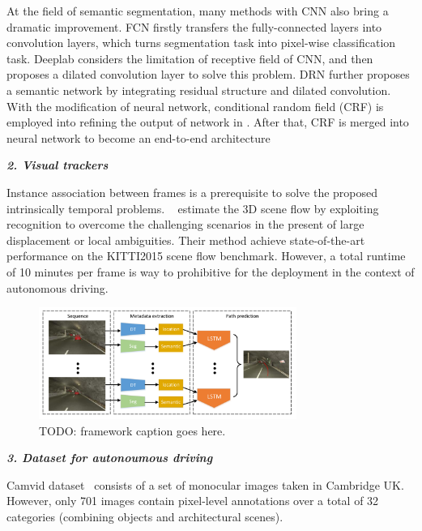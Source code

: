 \documentclass[10pt,twocolumn,letterpaper]{article}
\begin{document}
At the field of semantic segmentation, many methods with CNN also bring a dramatic improvement. FCN \cite{long2015fully} firstly transfers the fully-connected layers into convolution layers, which turns segmentation task into pixel-wise classification task. Deeplab \cite{chen2016deeplab} considers the limitation of receptive field of CNN, and then proposes a dilated convolution layer to solve this problem. DRN \cite{yu2017dilated} further proposes a semantic network by integrating residual structure and dilated convolution. With the modification of neural network, conditional random field (CRF) is employed into refining the output of network in \cite{chen2016deeplab}. After that, CRF is merged into neural network to become an end-to-end architecture \cite{liu2015semantic,zheng2015conditional,arnab2016higher}

\textbf{\emph{2. Visual trackers}}

Instance association between frames is a prerequisite to solve the proposed intrinsically temporal problems. ~\cite{behl2017bounding} estimate the 3D scene flow by exploiting recognition to overcome the challenging scenarios in the present of large displacement or local ambiguities. Their method achieve state-of-the-art performance on the KITTI2015 scene flow benchmark. However, a total runtime of 10 minutes per frame is way to prohibitive for the deployment in the context of autonomous driving.


\begin{figure}[t]
        \centering
        \includegraphics[width=0.75\textwidth]{figures/framework.pdf}
        \caption{ {\small TODO: framework caption goes here.}}
        \label{fig:framework}
\end{figure}

\textbf{\emph{3. Dataset for autonoumous driving}}

Camvid dataset~\cite{Camvid} consists of a set of monocular images taken in Cambridge UK. However, only 701 images contain pixel-level annotations over a total of 32 categories (combining objects and architectural scenes).
\end{document}

